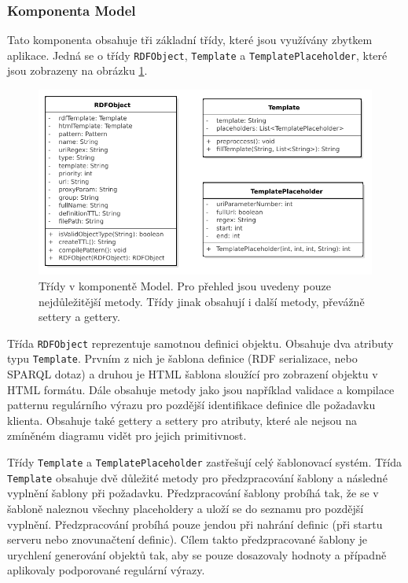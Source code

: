 \documentclass[thesis=B,czech]{FITthesis}[2012/06/26]
\begin{document}
    \subsubsection{Komponenta Model}\label{component_model}
    Tato komponenta obsahuje tři základní třídy, které jsou využívány zbytkem aplikace. Jedná se o třídy  \texttt{RDFObject},  \texttt{Template} a  \texttt{TemplatePlaceholder}, které jsou zobrazeny
    na obrázku \ref{model_class}.
    
     \begin{figure}\centering
	\includegraphics[width=\textwidth]{Model.pdf}
	\caption[Model tříd komponenty model]{Třídy v komponentě Model. Pro přehled jsou uvedeny pouze nejdůležitější metody. Třídy jinak obsahují i další metody, převážně settery a gettery.}\label{model_class}
    \end{figure}
    
    Třída  \texttt{RDFObject} reprezentuje samotnou definici objektu. Obsahuje dva atributy typu  \texttt{Template}.
    Prvním z nich je šablona definice (RDF serializace, nebo SPARQL dotaz) a
    druhou je HTML šablona sloužící pro zobrazení objektu v HTML formátu. Dále obsahuje metody jako jsou například validace a kompilace patternu
    regulárního výrazu pro pozdější identifikace definice dle požadavku klienta. Obsahuje také gettery a settery pro atributy, které ale nejsou
    na zmíněném diagramu vidět pro jejich primitivnost.
    
    Třídy  \texttt{Template} a  \texttt{TemplatePlaceholder} zastřešují celý šablonovací systém. Třída  \texttt{Template} obsahuje dvě důležité metody pro předzpracování šablony
    a následné vyplnění šablony při požadavku. Předzpracování šablony probíhá tak, že se v šabloně naleznou všechny placeholdery a uloží se do seznamu
    pro pozdější vyplnění. Předzpracování probíhá pouze jendou při nahrání definic (při startu serveru nebo znovunačtení definic). Cílem takto
    předzpracované šablony je urychlení generování objektů tak, aby se pouze dosazovaly hodnoty a případně aplikovaly podporované regulární výrazy.
 
\end{document}
